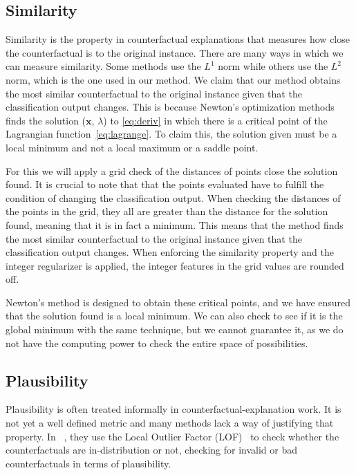 \documentclass[12pt]{extarticle}
\numberwithin{equation}{section}
\begin{document}
\subsection{Similarity}\label{sec:similarity}
Similarity is the property in counterfactual explanations that measures how close the counterfactual is to the original instance. There are many ways in which we can measure similarity. Some methods use the $L^1$ norm while others use the $L^2$ norm, which is the one used in our method. We claim that our method obtains the most similar counterfactual to the original instance given that the classification output changes. This is because Newton's optimization methods finds the solution ($\mathbf{x}$, $\lambda$) to \eqref{eq:deriv} in which there is a critical point of the Lagrangian function~\eqref{eq:lagrange}. To claim this, the solution given must be a local minimum and not a local maximum or a saddle point. 

For this we will apply a grid check of the distances of points close the solution found. It is crucial to note that that the points evaluated have to fulfill the condition of changing the classification output. When checking the distances of the points in the grid, they all are greater than the distance for the solution found, meaning that it is in fact a minimum. This means that the method finds the most similar counterfactual to the original instance given that the classification output changes. When enforcing the similarity property and the integer regularizer is applied, the integer features in the grid values are rounded off.

Newton's method is designed to obtain these critical points, and we have ensured that the solution found is a local minimum. We can also check to see if it is the global minimum with the same technique, but we cannot guarantee it, as we do not have the computing power to check the entire space of possibilities.

\subsection{Plausibility}\label{sec:plausibility}
Plausibility is often treated informally in counterfactual-explanation work. It is not yet a well defined metric and many methods lack a way of justifying that property. In ~\cite{plausibility}, they use the Local Outlier Factor (LOF)~\cite{lof} to check whether the counterfactuals are in-distribution or not, checking for invalid or bad counterfactuals in terms of plausibility.
\end{document}
